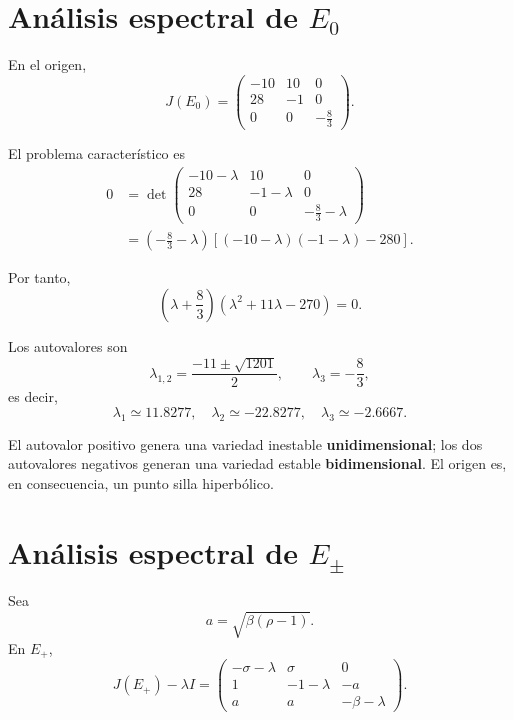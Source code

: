 \documentclass[12pt,a4paper,oneside]{report}
\numberwithin{equation}{chapter}
\begin{document}
\section{Análisis espectral de \(E_0\)}
En el origen,
\begin{equation}
    J(E_0)=
    \begin{pmatrix}
        -10&10&0\\
        28&-1&0\\
        0&0&-\frac83
    \end{pmatrix}.
\end{equation}

El problema característico es
\begin{align}
    0&=\det
    \begin{pmatrix}
        -10-\lambda&10&0\\
        28&-1-\lambda&0\\
        0&0&-\frac83-\lambda
    \end{pmatrix}\\
    &= \left(-\frac83-\lambda\right) \left[(-10-\lambda)(-1-\lambda)-280\right].
\end{align}

Por tanto,
\begin{equation}
    \left(\lambda+\frac83\right) \left(\lambda^2+11\lambda-270\right)=0.
\end{equation}

Los autovalores son
\begin{equation}
    \lambda_{1,2}=\frac{-11\pm\sqrt{1201}}{2}, \qquad \lambda_3=-\frac83,
\end{equation}
es decir,
\begin{equation}
    \boxed{ \lambda_1\simeq11.8277,\quad \lambda_2\simeq-22.8277,\quad \lambda_3\simeq-2.6667.}
\end{equation}

El autovalor positivo genera una variedad inestable \textbf{unidimensional}; los dos autovalores negativos generan una variedad estable \textbf{bidimensional}. El origen es, en consecuencia, un punto silla hiperbólico.

\section{Análisis espectral de \(E_{\pm}\)}
Sea
\[
    a=\sqrt{\beta(\rho-1)}.
\]
En \(E_+\),
\begin{equation}
    J(E_+)-\lambda I=
    \begin{pmatrix}
        -\sigma-\lambda&\sigma&0\\
        1&-1-\lambda&-a\\
        a&a&-\beta-\lambda
    \end{pmatrix}.
\end{equation}
\end{document}
